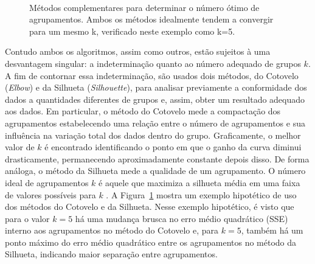 \documentclass{SBCbookchapter}
\begin{document}
\begin{figure}[ht]
    \begin{center}
        \mbox{
        }
        \mbox{
        }
    \end{center}
    \caption{Métodos complementares para determinar o número ótimo de agrupamentos. Ambos os métodos idealmente tendem a convergir para um mesmo k, verificado neste exemplo como k=5.}
    \label{fig:elbow_silhouette_ideal}
\end{figure}

Contudo ambos os algoritmos, assim como outros, estão sujeitos à uma desvantagem singular: a indeterminação quanto ao número adequado de grupos $k$. A fim de contornar essa indeterminação, são usados dois métodos, do Cotovelo (\textit{Elbow}) e da Silhueta (\textit{Silhouette}), para analisar previamente a conformidade dos dados a quantidades diferentes de grupos e, assim, obter um resultado adequado aos dados. Em particular, o método do Cotovelo mede a compactação dos agrupamentos estabelecendo uma relação entre o número de agrupamentos e sua influência na variação total dos dados dentro do grupo. Graficamente, o melhor valor de $k$ é encontrado identificando o ponto em que o ganho da curva diminui drasticamente, permanecendo aproximadamente constante depois disso. De forma análoga, o método da Silhueta mede a qualidade de um agrupamento. O número ideal de agrupamentos $k$ é aquele que maximiza a silhueta média em uma faixa de valores possíveis para $k$ \cite{ketchen1996application,rousseeuw1990finding}. A Figura~\ref{fig:elbow_silhouette_ideal} mostra um exemplo hipotético de uso dos métodos do Cotovelo e da Silhueta. Nesse exemplo hipotético, é visto que para o valor $k=5$ há uma mudança brusca no erro médio quadrático (SSE) interno aos agrupamentos no método do Cotovelo e, para $k=5$, também há um ponto máximo do erro médio quadrático entre os agrupamentos no método da Silhueta, indicando maior separação entre agrupamentos.
\end{document}
